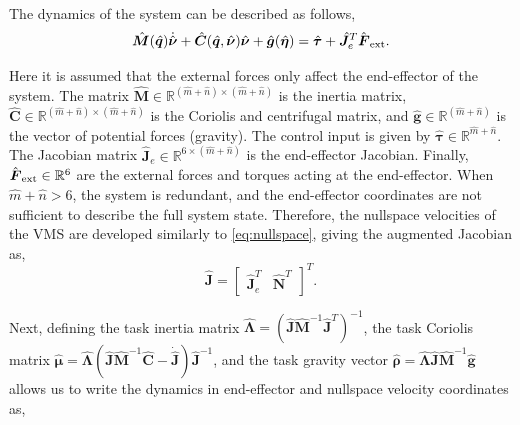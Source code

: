 \documentclass[../main.tex]{subfiles}
\begin{document}
The dynamics of the system can be described as follows,
\begin{equation}
    \label{eq:VMS_dynamics}
        \hat{\bm{M}}(\hat{\bm{q}})\dot{\hat{\bm{\nu}}}
        + \hat{\bm{C}}(\hat{\bm{q}}, \hat{\bm{\nu}})\hat{\bm{\nu}}
        + \hat{\bm{g}}(\hat{\bm{\eta}})
        = \hat{\bm{\tau}} + \hat{\bm{J}}_{e}^T \hat{\bm{{F}}}_{\rm ext}.
\end{equation} \par
Here it is assumed that the external forces only affect the end-effector of the system. The matrix $\hat{\bm{M}} \in \mathbb{R}^{(\hat{m}+\hat{n}) \times (\hat{m}+\hat{n})}$ is the inertia matrix, $\hat{\bm{C}} \in \mathbb{R}^{(\hat{m}+\hat{n}) \times (\hat{m}+\hat{n})}$ is the Coriolis and centrifugal matrix, and $\hat{\bm{g}} \in \mathbb{R}^{(\hat{m}+\hat{n})}$ is the vector of potential forces (gravity). The control input is given by $\hat{\bm{\tau}} \in \mathbb{R}^{\hat{m} + \hat{n}}$. The Jacobian matrix $\hat{\bm{J}}_{e} \in \mathbb{R}^{6 \times (\hat{m}+\hat{n})}$ is the end-effector Jacobian. Finally, $\hat{\bm{{F}}}_{\rm ext} \in \mathbb{R}^{6}$ are the external forces and torques acting at the end-effector.
 When $\hat{m} + \hat{n} > 6$, the system is redundant, and the end-effector coordinates are not sufficient to describe the full system state. Therefore, the nullspace velocities of the VMS are developed similarly to \eqref{eq:nullspace}, giving the augmented Jacobian as,
\begin{equation}
    \hat{\bm{J}} = \begin{bmatrix}
        \hat{\bm{J}}_e^T & \hat{\bm{N}}^T
    \end{bmatrix}^T.
\end{equation} \par
Next, defining the task inertia matrix $\hat{\bm{\Lambda}} = (\hat{\bm{J}}\hat{\bm{M}}^{-1}\hat{\bm{J}}^T)^{-1}$, the task Coriolis matrix $\hat{\bm{\mu}} = \hat{\bm{\Lambda}} \left( \hat{\bm{J}} \hat{\bm{M}}^{-1}\hat{\bm{C}} - \dot{\hat{\bm{J}}}\right)\hat{\bm{J}}^{-1}$, and the task gravity vector $\hat{\bm{\rho}} = \hat{\bm{\Lambda}} \hat{\bm{J}} \hat{\bm{M}}^{-1} \hat{\bm{g}} $ allows us to write the dynamics in end-effector and nullspace velocity coordinates as,
\end{document}

